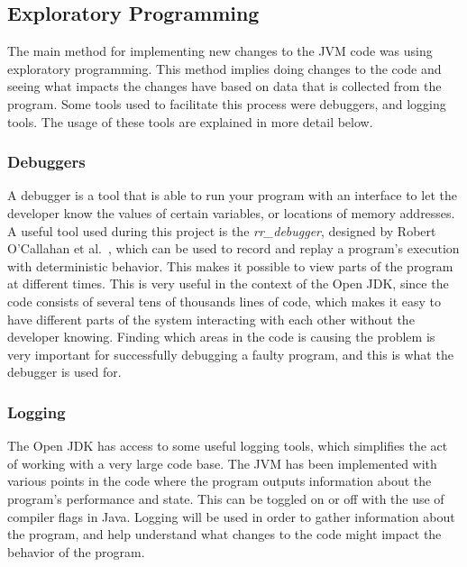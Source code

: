 

\subsection{Exploratory Programming}
The main method for implementing new changes to the JVM code was using exploratory programming. This method implies doing changes to the code and seeing what impacts the changes have based on data that is collected from the program. Some tools used to facilitate this process were debuggers, and logging tools. The usage of these tools are explained in more detail below.
\subsubsection{Debuggers}
A debugger is a tool that is able to run your program with an interface to let the developer know the values of certain variables, or locations of memory addresses. A useful tool used during this project is the \textit{rr\_debugger}, designed by Robert O'Callahan et al.~\cite{rrdebugger}, which can be used to record and replay a program's execution with deterministic behavior. This makes it possible to view parts of the program at different times. This is very useful in the context of the Open JDK, since the code consists of several tens of thousands lines of code, which makes it easy to have different parts of the system interacting with each other without the developer knowing. Finding which areas in the code is causing the problem is very important for successfully debugging a faulty program, and this is what the debugger is used for.

\subsubsection{Logging}
The Open JDK has access to some useful logging tools, which simplifies the act of working with a very large code base. The JVM has been implemented with various points in the code where the program outputs information about the program's performance and state. This can be toggled on or off with the use of compiler flags in Java. Logging will be used in order to gather information about the program, and help understand what changes to the code might impact the behavior of the program.
